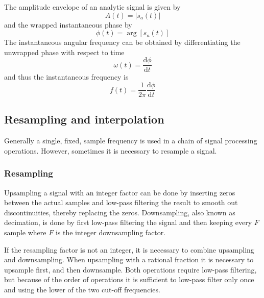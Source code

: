 The amplitude envelope of an analytic signal is given by
\begin{equation}
 A(t) = |s_a(t)|
\end{equation}
and the wrapped instantaneous phase by
\begin{equation}
 \phi(t) = \arg{\left[s_a(t) \right]}
\end{equation}
The instantaneous angular frequency can be obtained by differentiating the unwrapped phase with respect to time
\begin{equation}
 \omega (t) = \frac{\mathrm{d}\phi}{\mathrm{d}t}
\end{equation}
and thus the instantaneous frequency is
\begin{equation}
 f (t) = \frac{1}{2\pi} \frac{\mathrm{d}\phi}{\mathrm{d}t}
\end{equation}

%
%

\subsection{Resampling and interpolation}\label{sec:theory:signal:resampling}
Generally a single, fixed, sample frequency is used in a chain of signal
processing operations. However, sometimes it is necessary to resample a signal.

\subsubsection{Resampling}
Upsampling a signal with an integer factor can be done by inserting zeros
between the actual samples and low-pass filtering the result to smooth out
discontinuities, thereby replacing the zeros. Downsampling, also known as
decimation, is done by first low-pass filtering the signal and then keeping
every $F$ sample where $F$ is the integer downsampling factor.

If the resampling factor is not an integer, it is necessary to combine
upsampling and downsampling. When upsampling with a rational fraction it is
necessary to upsample first, and then downsample. Both operations require
low-pass filtering, but because of the order of operations it is sufficient to
low-pass filter only once and using the lower of the two cut-off frequencies.

